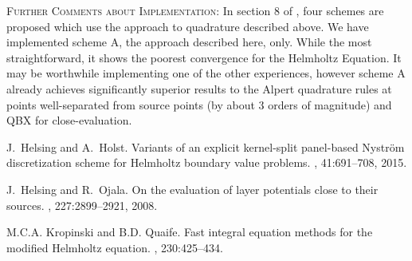 \documentclass[12pt]{article}
\begin{document}
\noindent \textsc{Further Comments about Implementation:} In section 8 of \cite{HelsingHolst}, four schemes are proposed which use the approach to quadrature described above. We have implemented scheme A, the approach described here, only. While the most straightforward, it shows the poorest convergence for the Helmholtz Equation.  It may be worthwhile implementing one of the other experiences, however scheme A already achieves significantly superior results to the Alpert quadrature rules at points well-separated from source points (by about 3 orders of magnitude) \cite{KropinskiQuaife} and QBX for close-evaluation. 


\begin{thebibliography}{10}

J.~Helsing and A.~Holst.
\newblock Variants of an explicit kernel-split panel-based Nystr\" om discretization scheme for Helmholtz boundary value problems.
, 41:691--708, 2015.

J.~Helsing and R.~Ojala.
\newblock On the evaluation of layer potentials close to their sources.
, 227:2899--2921, 2008.

M.C.A. Kropinski and B.D. Quaife.
\newblock Fast integral equation methods for the modified Helmholtz equation.
, 230:425--434.

\end{thebibliography}
\end{document}

